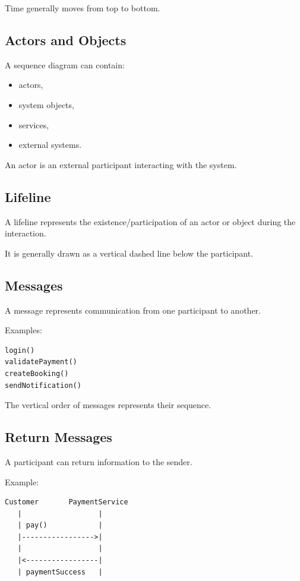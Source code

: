 \documentclass[11pt,a4paper]{article}
\begin{document}
Time generally moves from top to bottom.

\subsection{Actors and Objects}

A sequence diagram can contain:

\begin{itemize}
    \item actors,
    \item system objects,
    \item services,
    \item external systems.
\end{itemize}

An actor is an external participant interacting with the system.

\subsection{Lifeline}

A lifeline represents the existence/participation of an actor or object during
the interaction.

It is generally drawn as a vertical dashed line below the participant.

\subsection{Messages}

A message represents communication from one participant to another.

Examples:

\begin{verbatim}
login()
validatePayment()
createBooking()
sendNotification()
\end{verbatim}

The vertical order of messages represents their sequence.

\subsection{Return Messages}

A participant can return information to the sender.

Example:

\begin{verbatim}
Customer       PaymentService
   |                  |
   | pay()            |
   |----------------->|
   |                  |
   |<-----------------|
   | paymentSuccess   |
\end{verbatim}
\end{document}
